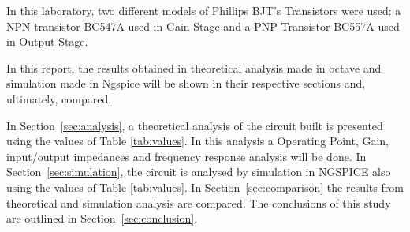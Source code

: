 In this laboratory, two different models of Phillips BJT's Transistors were used: a NPN transistor BC547A used in Gain Stage and a PNP Transistor BC557A used in Output Stage.

In this report, the results obtained in theoretical analysis made in octave and simulation made in Ngspice will be shown in their respective sections and, ultimately, compared.

In Section~\ref{sec:analysis}, a theoretical analysis of the circuit built is presented using the values of Table \ref{tab:values}. In this analysis a Operating Point, Gain, input/output impedances and frequency response analysis will be done. In Section~\ref{sec:simulation}, the circuit is analysed by simulation in NGSPICE also using the values of Table \ref{tab:values}. In Section~\ref{sec:comparison} the results from theoretical and simulation analysis are compared. The conclusions of this study are outlined in Section~\ref{sec:conclusion}.



